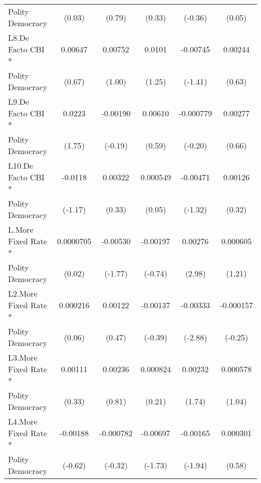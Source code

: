 {\begin{tabular}{l*{5}{c}}
Polity Democracy    &      (0.03)         &      (0.79)         &      (0.33)         &     (-0.36)         &      (0.05)         \\
[1em]
L8.De Facto CBI *   &     0.00647         &     0.00752         &      0.0101         &    -0.00745         &     0.00244         \\
Polity Democracy    &      (0.67)         &      (1.00)         &      (1.25)         &     (-1.41)         &      (0.63)         \\
[1em]
L9.De Facto CBI *   &      0.0223         &    -0.00190         &     0.00610         &   -0.000779         &     0.00277         \\
Polity Democracy    &      (1.75)         &     (-0.19)         &      (0.59)         &     (-0.20)         &      (0.66)         \\
[1em]
L10.De Facto CBI *  &     -0.0118         &     0.00322         &    0.000549         &    -0.00471         &     0.00126         \\
Polity Democracy    &     (-1.17)         &      (0.33)         &      (0.05)         &     (-1.32)         &      (0.32)         \\
[1em]
L.More Fixed Rate * &   0.0000705         &    -0.00530         &    -0.00197         &     0.00276\sym{**} &    0.000605         \\
Polity Democracy    &      (0.02)         &     (-1.77)         &     (-0.74)         &      (2.98)         &      (1.21)         \\
[1em]
L2.More Fixed Rate *&    0.000216         &     0.00122         &    -0.00137         &    -0.00333\sym{**} &   -0.000157         \\
Polity Democracy    &      (0.06)         &      (0.47)         &     (-0.39)         &     (-2.88)         &     (-0.25)         \\
[1em]
L3.More Fixed Rate *&     0.00111         &     0.00236         &    0.000824         &     0.00232         &    0.000578         \\
Polity Democracy    &      (0.33)         &      (0.81)         &      (0.21)         &      (1.74)         &      (1.04)         \\
[1em]
L4.More Fixed Rate *&    -0.00188         &   -0.000782         &    -0.00697         &    -0.00165         &    0.000301         \\
Polity Democracy    &     (-0.62)         &     (-0.32)         &     (-1.73)         &     (-1.94)         &      (0.58)         \\

\end{tabular}}
